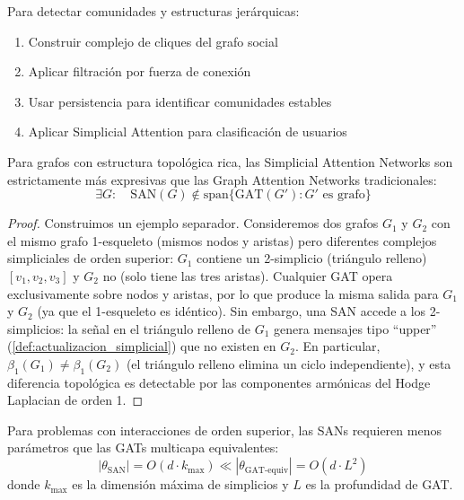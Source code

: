 \begin{application}\label{app:redes_sociales}
Para detectar comunidades y estructuras jerárquicas:
\begin{enumerate}
    \item Construir complejo de cliques del grafo social
    \item Aplicar filtración por fuerza de conexión
    \item Usar persistencia para identificar comunidades estables
    \item Aplicar Simplicial Attention para clasificación de usuarios
\end{enumerate}
\end{application}

\begin{theorem}\label{thm:poder_expresivo_sans}
Para grafos con estructura topológica rica, las Simplicial Attention Networks son estrictamente más expresivas que las Graph Attention Networks tradicionales:
\begin{equation}
    \exists G: \quad \text{SAN}(G) \not\in \text{span}\{\text{GAT}(G'): G' \text{ es grafo}\}
\end{equation}
\end{theorem}

\begin{proof}
Construimos un ejemplo separador. Consideremos dos grafos $G_1$ y $G_2$ con el mismo grafo 1-esqueleto (mismos nodos y aristas) pero diferentes complejos simpliciales de orden superior: $G_1$ contiene un 2-simplicio (triángulo relleno) $[v_1, v_2, v_3]$ y $G_2$ no (solo tiene las tres aristas). Cualquier \gls{GAT} opera exclusivamente sobre nodos y aristas, por lo que produce la misma salida para $G_1$ y $G_2$ (ya que el 1-esqueleto es idéntico). Sin embargo, una SAN accede a los 2-simplicios: la señal en el triángulo relleno de $G_1$ genera mensajes tipo ``upper'' (\autoref{def:actualizacion_simplicial}) que no existen en $G_2$. En particular, $\beta_1(G_1) \neq \beta_1(G_2)$ (el triángulo relleno elimina un ciclo independiente), y esta diferencia topológica es detectable por las componentes armónicas del Hodge Laplacian de orden 1.
\end{proof}

\begin{corollary}\label{cor:ventaja_computacional_sans}
Para problemas con interacciones de orden superior, las SANs requieren menos parámetros que las \glspl{GAT} multicapa equivalentes:
\begin{equation}
    |\theta_{\text{SAN}}| = O(d \cdot k_{\max}) \ll |\theta_{\text{GAT-equiv}}| = O(d \cdot L^2)
\end{equation}
donde $k_{\max}$ es la dimensión máxima de simplicios y $L$ es la profundidad de \gls{GAT}.
\end{corollary}

